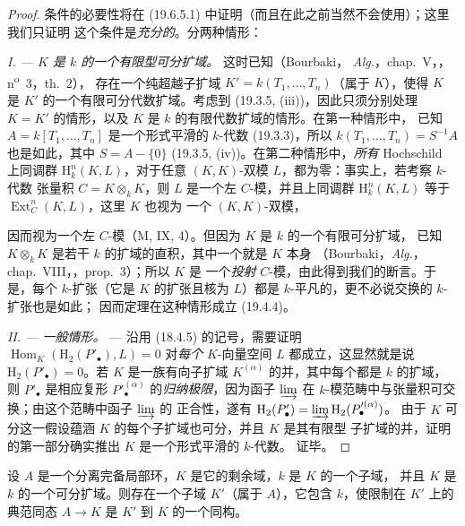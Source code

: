 \begin{proof}
条件的必要性将在 (19.6.5.1) 中证明（而且在此之前当然不会使用）；这里我们只证明
这个条件是\emph{充分的}。分两种情形：

\emph{I. --- $K$ 是 $k$ 的一个有限型可分扩域。} 这时已知（Bourbaki，
\emph{Alg.}，chap.~V，，n\textsuperscript{o}~3，th.~2），
存在一个纯超越子扩域 $K'=k(T_1,\ldots,T_n)$（属于 $K$），使得 $K$ 是
$K'$ 的一个有限可分代数扩域。考虑到 (19.3.5, (iii))，因此只须分别处理
$K=K'$ 的情形，以及 $K$ 是 $k$ 的有限代数扩域的情形。在第一种情形中，
已知 $A=k[T_1,\ldots,T_n]$ 是一个形式平滑的 $k$-代数 (19.3.3)，所以
$k(T_1,\ldots,T_n)=S^{-1}A$ 也是如此，其中 $S=A-\{0\}$
(19.3.5, (iv))。在第二种情形中，\emph{所有} Hochschild 上同调群
$\mathrm H_k^n(K,L)$，对于任意 $(K,K)$-双模 $L$，都为零：事实上，若考察 $k$-代数
张量积 $C=K\otimes_k K$，则 $L$ 是一个左 $C$-模，并且上同调群
$\mathrm H_k^n(K,L)$ 等于 $\operatorname{Ext}_C^n(K,L)$，这里 $K$ 也视为
一个 $(K,K)$-双模，


因而视为一个左 $C$-模（M, IX, 4）。但因为 $K$ 是 $k$ 的一个有限可分扩域，
已知 $K\otimes_k K$ 是若干 $k$ 的扩域的直积，其中一个就是 $K$ 本身
（Bourbaki，\emph{Alg.}，chap.~VIII，，prop.~3）；所以 $K$ 是
一个\emph{投射} $C$-模，由此得到我们的断言。于是，每个 $k$-扩张（它是
$K$ 的扩张且核为 $L$）都是 $k$-平凡的，更不必说交换的 $k$-扩张也是如此；
因而定理在这种情形成立 (19.4.4)。

\emph{II. --- 一般情形。} --- 沿用 (18.4.5) 的记号，需要证明
$\operatorname{Hom}_K(\mathrm H_2(P'_\bullet),L)=0$ 对\emph{每个}
$K$-向量空间 $L$ 都成立，这显然就是说 $\mathrm H_2(P'_\bullet)=0$。若
$K$ 是一族有向子扩域 $K^{(\alpha)}$ 的并，其中每个都是 $k$ 的扩域，则
$P'_\bullet$ 是相应复形 $P'^{(\alpha)}_\bullet$ 的\emph{归纳极限}，因为函子
$\varinjlim$ 在 $k$-模范畴中与张量积可交换；由这个范畴中函子 $\varinjlim$ 的
正合性，遂有
$\mathrm H_2(P'_\bullet)=\varinjlim\mathrm H_2(P'^{(\alpha)}_\bullet)$。
由于 $K$ 可分这一假设蕴涵 $K$ 的每个子扩域也可分，并且 $K$ 是其有限型
子扩域的并，证明的第一部分确实推出 $K$ 是一个形式平滑的 $k$-代数。
证毕。
\end{proof}

\begin{corollary}[19.6.2]
\label{0.19.6.2-fr}
设 $A$ 是一个分离完备局部环，$K$ 是它的剩余域，$k$ 是 $K$ 的一个子域，
并且 $K$ 是 $k$ 的一个可分扩域。则存在一个子域 $K'$（属于 $A$），它包含
$k$，使限制在 $K'$ 上的典范同态 $A\to K$ 是 $K'$ 到 $K$ 的一个同构。
\end{corollary}

